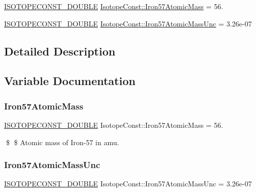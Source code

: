 \begin{DoxyCompactItemize}
\item 
\mbox{\hyperlink{group___isotope_const-_macros_ga8f45a7272ce02c0b4c65c44636ed719a}{I\+S\+O\+T\+O\+P\+E\+C\+O\+N\+S\+T\+\_\+\+D\+O\+U\+B\+LE}} \mbox{\hyperlink{group___isotope_const-_iron-_fe57_gae43d5bdeba2c0bca6ad1c7eb56f05415}{Isotope\+Const\+::\+Iron57\+Atomic\+Mass}} = 56.
\item 
\mbox{\hyperlink{group___isotope_const-_macros_ga8f45a7272ce02c0b4c65c44636ed719a}{I\+S\+O\+T\+O\+P\+E\+C\+O\+N\+S\+T\+\_\+\+D\+O\+U\+B\+LE}} \mbox{\hyperlink{group___isotope_const-_iron-_fe57_gac17781980c5b28a4ae8315abf37e8990}{Isotope\+Const\+::\+Iron57\+Atomic\+Mass\+Unc}} = 3.\+26e-\/07
\end{DoxyCompactItemize}


\subsection{Detailed Description}


\subsection{Variable Documentation}
\mbox{\label{group___isotope_const-_iron-_fe57_gae43d5bdeba2c0bca6ad1c7eb56f05415}} 
\subsubsection{\texorpdfstring{Iron57\+Atomic\+Mass}{Iron57AtomicMass}}
{\footnotesize\ttfamily \mbox{\hyperlink{group___isotope_const-_macros_ga8f45a7272ce02c0b4c65c44636ed719a}{I\+S\+O\+T\+O\+P\+E\+C\+O\+N\+S\+T\+\_\+\+D\+O\+U\+B\+LE}} Isotope\+Const\+::\+Iron57\+Atomic\+Mass = 56.}

\$ \$ Atomic mass of Iron-\/57 in amu. \mbox{\label{group___isotope_const-_iron-_fe57_gac17781980c5b28a4ae8315abf37e8990}} 
\subsubsection{\texorpdfstring{Iron57\+Atomic\+Mass\+Unc}{Iron57AtomicMassUnc}}
{\footnotesize\ttfamily \mbox{\hyperlink{group___isotope_const-_macros_ga8f45a7272ce02c0b4c65c44636ed719a}{I\+S\+O\+T\+O\+P\+E\+C\+O\+N\+S\+T\+\_\+\+D\+O\+U\+B\+LE}} Isotope\+Const\+::\+Iron57\+Atomic\+Mass\+Unc = 3.\+26e-\/07}

